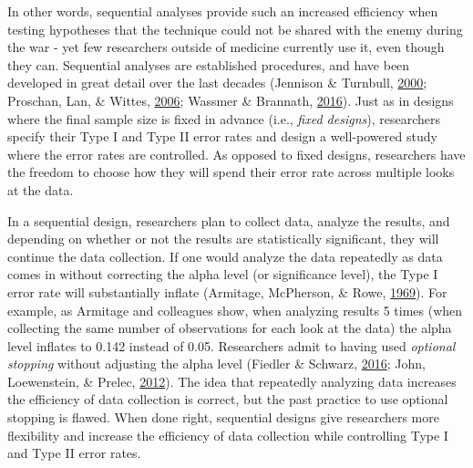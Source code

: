 \documentclass[
  english,
  ,man,floatsintext]{apa6}
\begin{document}
In other words, sequential analyses provide such an increased efficiency when testing hypotheses that the technique could not be shared with the enemy during the war - yet few researchers outside of medicine currently use it, even though they can. Sequential analyses are established procedures, and have been developed in great detail over the last decades (Jennison \& Turnbull, \protect\hyperlink{ref-jennison_group_2000}{2000}; Proschan, Lan, \& Wittes, \protect\hyperlink{ref-proschan_statistical_2006}{2006}; Wassmer \& Brannath, \protect\hyperlink{ref-wassmer_group_2016}{2016}). Just as in designs where the final sample size is fixed in advance (i.e., \emph{fixed designs}), researchers specify their Type I and Type II error rates and design a well-powered study where the error rates are controlled. As opposed to fixed designs, researchers have the freedom to choose how they will spend their error rate across multiple looks at the data.

In a sequential design, researchers plan to collect data, analyze the results, and depending on whether or not the results are statistically significant, they will continue the data collection. If one would analyze the data repeatedly as data comes in without correcting the alpha level (or significance level), the Type I error rate will substantially inflate (Armitage, McPherson, \& Rowe, \protect\hyperlink{ref-armitage_repeated_1969}{1969}). For example, as Armitage and colleagues show, when analyzing results 5 times (when collecting the same number of observations for each look at the data) the alpha level inflates to 0.142 instead of 0.05. Researchers admit to having used \emph{optional stopping} without adjusting the alpha level (Fiedler \& Schwarz, \protect\hyperlink{ref-fiedler_questionable_2016}{2016}; John, Loewenstein, \& Prelec, \protect\hyperlink{ref-john_measuring_2012}{2012}). The idea that repeatedly analyzing data increases the efficiency of data collection is correct, but the past practice to use optional stopping is flawed. When done right, sequential designs give researchers more flexibility and increase the efficiency of data collection while controlling Type I and Type II error rates.
\end{document}
